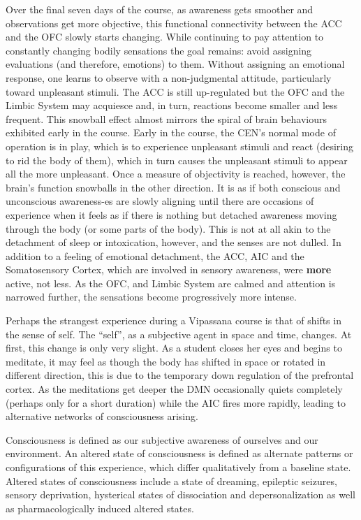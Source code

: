 \documentclass[a4paper, amsfonts, amssymb, amsmath, reprint, showkeys, nofootinbib, twoside]{revtex4-1}
\begin{document}
Over the final seven days of the course, as awareness gets smoother and observations get more objective, this
functional connectivity between the ACC and the OFC slowly starts changing. While
continuing to pay attention to constantly changing bodily sensations the goal remains: avoid
assigning evaluations (and therefore, emotions) to them. Without assigning an
emotional response, one learns to observe with a
non-judgmental attitude, particularly toward unpleasant stimuli. The ACC is still up-regulated
but the OFC and the Limbic System may acquiesce and, in turn, reactions become smaller and less
frequent. This snowball effect almost mirrors the spiral of brain behaviours
exhibited early in the course. Early in the course, the CEN's normal mode of
operation is in play, which is to experience unpleasant stimuli and react (desiring to rid the body of
them), which in turn causes the unpleasant stimuli to appear all the more
unpleasant. Once a measure of objectivity is reached, however, the brain's function
snowballs in the other direction. It is as if both conscious and unconscious awareness-es are slowly aligning
until there are occasions of experience when it feels as if there is nothing but detached awareness moving
through the body (or some parts of the body). This is not at all akin to the
detachment of sleep or intoxication, however, and the senses are not dulled. In
addition to a feeling of emotional detachment, the ACC, AIC and the Somatosensory
Cortex, which are involved in sensory awareness, were \textbf{more} active, not
less. As the OFC, and Limbic System are calmed and attention is narrowed
further, the sensations become progressively more intense.

Perhaps the strangest experience during a Vipassana course is that of shifts in the
sense of self. The ``self'', as a subjective agent in space and time, changes. At
first, this change is only very slight. As a student closes her eyes and begins to
meditate, it may feel as though the body has shifted in space or rotated in different direction, this is
due to the temporary down regulation of the prefrontal cortex. As the meditations get deeper the DMN
occasionally quiets completely (perhaps only for a short duration) while the AIC
fires more rapidly, leading to alternative networks of consciousness
arising.

Consciousness is defined as our subjective awareness of ourselves and our environment.
An altered state of consciousness is defined as alternate patterns or configurations of
this experience, which differ qualitatively from a baseline state.
Altered states of consciousness include a state of dreaming, epileptic seizures, sensory deprivation,
hysterical states of dissociation and depersonalization as well as pharmacologically induced altered states.
\end{document}
